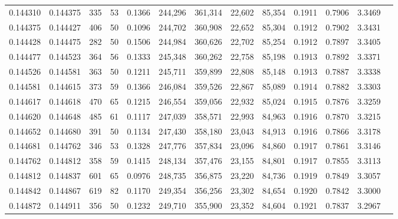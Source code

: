 \begin{tabular}{rrrrrrrrrrrrr}
0.144310 & 0.144375 &   335 &  53 &                                     0.1366 & 244,296 & 361,314 &  22,602 &  85,354 & 0.1911 & 0.7906 & 3.3469 \\
0.144375 & 0.144427 &   406 &  50 &                                     0.1096 & 244,702 & 360,908 &  22,652 &  85,304 & 0.1912 & 0.7902 & 3.3431 \\
0.144428 & 0.144475 &   282 &  50 &                                     0.1506 & 244,984 & 360,626 &  22,702 &  85,254 & 0.1912 & 0.7897 & 3.3405 \\
0.144477 & 0.144523 &   364 &  56 &                                     0.1333 & 245,348 & 360,262 &  22,758 &  85,198 & 0.1913 & 0.7892 & 3.3371 \\
0.144526 & 0.144581 &   363 &  50 &                                     0.1211 & 245,711 & 359,899 &  22,808 &  85,148 & 0.1913 & 0.7887 & 3.3338 \\
0.144581 & 0.144615 &   373 &  59 &                                     0.1366 & 246,084 & 359,526 &  22,867 &  85,089 & 0.1914 & 0.7882 & 3.3303 \\
0.144617 & 0.144618 &   470 &  65 &                                     0.1215 & 246,554 & 359,056 &  22,932 &  85,024 & 0.1915 & 0.7876 & 3.3259 \\
0.144620 & 0.144648 &   485 &  61 &                                     0.1117 & 247,039 & 358,571 &  22,993 &  84,963 & 0.1916 & 0.7870 & 3.3215 \\
0.144652 & 0.144680 &   391 &  50 &                                     0.1134 & 247,430 & 358,180 &  23,043 &  84,913 & 0.1916 & 0.7866 & 3.3178 \\
0.144681 & 0.144762 &   346 &  53 &                                     0.1328 & 247,776 & 357,834 &  23,096 &  84,860 & 0.1917 & 0.7861 & 3.3146 \\
0.144762 & 0.144812 &   358 &  59 &                                     0.1415 & 248,134 & 357,476 &  23,155 &  84,801 & 0.1917 & 0.7855 & 3.3113 \\
0.144812 & 0.144837 &   601 &  65 &                                     0.0976 & 248,735 & 356,875 &  23,220 &  84,736 & 0.1919 & 0.7849 & 3.3057 \\
0.144842 & 0.144867 &   619 &  82 &                                     0.1170 & 249,354 & 356,256 &  23,302 &  84,654 & 0.1920 & 0.7842 & 3.3000 \\
0.144872 & 0.144911 &   356 &  50 &                                     0.1232 & 249,710 & 355,900 &  23,352 &  84,604 & 0.1921 & 0.7837 & 3.2967 \\

\end{tabular}
